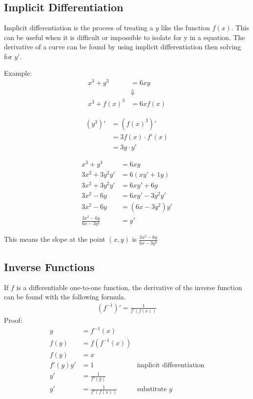 \documentclass{article}
\theoremstyle{mytheoremstyle}
\theoremstyle{mytheoremstyle}
\theoremstyle{myproblemstyle}
\begin{document}
    \subsection*{Implicit Differentiation}
    Implicit differentiation is the process of treating a $y$ like the function
    $f(x)$. This can be useful when it is difficult or impossible to isolate for
    y in a equation. The derivative of a curve can be found by using implicit
    differentiation then solving for $y'$.

    Example:
    \begin{align*}
        x^3+y^3&=6xy \\
               &\Downarrow \\
        x^3+f(x)^3 &= 6xf(x)
    \end{align*}

    \begin{align*}
        (y^3)' &= (f(x)^3)' \\
        &= 3f(x) \cdot f'(x) \\
        &= 3y \cdot y'
    \end{align*}

    \begin{align*}
        x^3+y^3                 &= 6xy \\
        3x^2 + 3y^2y'           &= 6(xy'+1y) \\
        3x^2+3y^2y'             &= 6xy'+6y \\
        3x^2-6y                 &= 6xy'-3y^2y' \\
        3x^2-6y                 &= (6x-3y^2)y' \\
        \frac{3x^2-6y}{6x-3y^2} &= y'
    \end{align*}

    This means the slope at the point $(x,y)$ is $\frac{3x^2-6y}{6x-3y^2}$

    \subsection*{Inverse Functions}
    If $f$ is a differentiable one-to-one function, the derivative of the
    inverse function can be found with the following formula.
    \begin{align*}
        (f^{-1})' = \frac{1}{f'(f(x))}
    \end{align*}
    Proof:
    \begin{align*}
        y &= f^{-1}(x) \\
        f(y) &= f(f^{-1}(x)) \\
        f(y) &= x \\
        f'(y)y' &= 1 & \text{implicit differentiation} \\
        y' &= \frac{1}{f'(y)} \\
        y' &= \frac{1}{f'(f(x))} & \text{substitute $y$} \\
    \end{align*}
\end{document}
